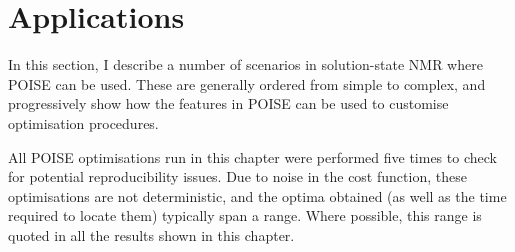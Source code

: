 \section{Applications}
\label{sec:poise__applications}

In this section, I describe a number of scenarios in solution-state NMR where POISE can be used.
These are generally ordered from simple to complex, and progressively show how the features in POISE can be used to customise optimisation procedures.

All POISE optimisations run in this chapter were performed five times to check for potential reproducibility issues.
Due to noise in the cost function, these optimisations are not deterministic, and the optima obtained (as well as the time required to locate them) typically span a range.
Where possible, this range is quoted in all the results shown in this chapter.











